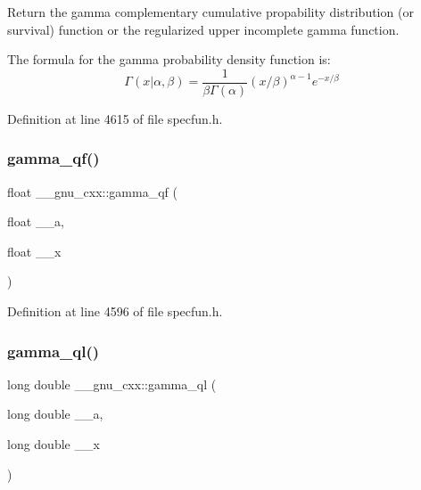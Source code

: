 Return the gamma complementary cumulative propability distribution (or survival) function or the regularized upper incomplete gamma function. 

The formula for the gamma probability density function is\+: \[ \Gamma(x|\alpha,\beta) = \frac{1}{\beta\Gamma(\alpha)} (x/\beta)^{\alpha - 1} e^{-x/\beta} \] 

Definition at line 4615 of file specfun.\+h.

\mbox{\label{group__gnu__math__spec__func_ga3ee8d2c40b904952538709cbb0e664a4}} 
\subsubsection{\texorpdfstring{gamma\+\_\+qf()}{gamma\_qf()}}
{\footnotesize\ttfamily float \+\_\+\+\_\+gnu\+\_\+cxx\+::gamma\+\_\+qf (\begin{DoxyParamCaption}\item[{float}]{\+\_\+\+\_\+a,  }\item[{float}]{\+\_\+\+\_\+x }\end{DoxyParamCaption})\hspace{0.3cm}{\ttfamily [inline]}}



Definition at line 4596 of file specfun.\+h.

\mbox{\label{group__gnu__math__spec__func_ga5364a098596681809294d25741539ffc}} 
\subsubsection{\texorpdfstring{gamma\+\_\+ql()}{gamma\_ql()}}
{\footnotesize\ttfamily long double \+\_\+\+\_\+gnu\+\_\+cxx\+::gamma\+\_\+ql (\begin{DoxyParamCaption}\item[{long double}]{\+\_\+\+\_\+a,  }\item[{long double}]{\+\_\+\+\_\+x }\end{DoxyParamCaption})\hspace{0.3cm}{\ttfamily [inline]}}



